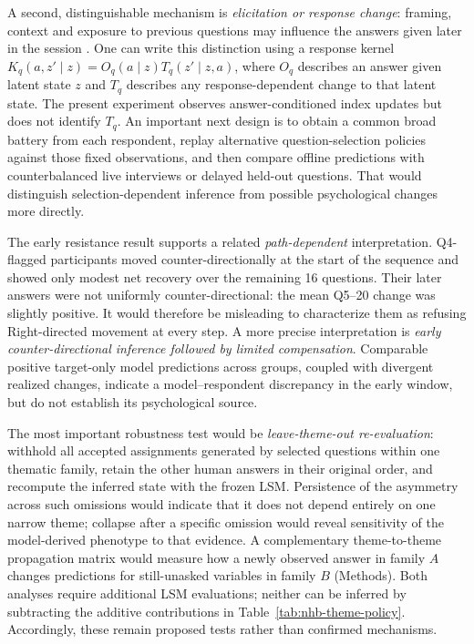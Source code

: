 \documentclass[11pt]{article}
\begin{document}
A second, distinguishable mechanism is \emph{elicitation or response change}: framing, context and exposure to previous questions may influence the answers given later in the session \citep{schwarz1999,tourangeau2000}. One can write this distinction using a response kernel $K_q(a,z'\mid z)=O_q(a\mid z)T_q(z'\mid z,a)$, where $O_q$ describes an answer given latent state $z$ and $T_q$ describes any response-dependent change to that latent state. The present experiment observes answer-conditioned index updates but does not identify $T_q$. An important next design is to obtain a common broad battery from each respondent, replay alternative question-selection policies against those fixed observations, and then compare offline predictions with counterbalanced live interviews or delayed held-out questions. That would distinguish selection-dependent inference from possible psychological changes more directly.

The early resistance result supports a related \emph{path-dependent} interpretation. Q4-flagged participants moved counter-directionally at the start of the sequence and showed only modest net recovery over the remaining 16 questions. Their later answers were not uniformly counter-directional: the mean Q5--20 change was slightly positive. It would therefore be misleading to characterize them as refusing Right-directed movement at every step. A more precise interpretation is \emph{early counter-directional inference followed by limited compensation}. Comparable positive target-only model predictions across groups, coupled with divergent realized changes, indicate a model--respondent discrepancy in the early window, but do not establish its psychological source.

The most important robustness test would be \emph{leave-theme-out re-evaluation}: withhold all accepted assignments generated by selected questions within one thematic family, retain the other human answers in their original order, and recompute the inferred state with the frozen LSM. Persistence of the asymmetry across such omissions would indicate that it does not depend entirely on one narrow theme; collapse after a specific omission would reveal sensitivity of the model-derived phenotype to that evidence. A complementary theme-to-theme propagation matrix would measure how a newly observed answer in family $A$ changes predictions for still-unasked variables in family $B$ (Methods). Both analyses require additional LSM evaluations; neither can be inferred by subtracting the additive contributions in Table~\ref{tab:nhb-theme-policy}. Accordingly, these remain proposed tests rather than confirmed mechanisms.
\end{document}
